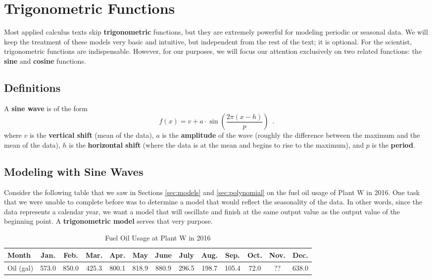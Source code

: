 \section{Trigonometric Functions}
\label{sec:trig}

Most applied calculus texts skip {\bf trigonometric} functions, but they are extremely powerful for modeling periodic or seasonal data. We will keep the treatment of these models very basic and intuitive, but independent from the rest of the text; it is optional. For the scientist, trigonometric functions are indispensable. However, for our purposes, we will focus our attention exclusively on two related functions: the {\bf sine} and {\bf cosine} functions.

\subsection{Definitions}


A {\bf sine wave} is of the form
\begin{equation}
\label{eq:sine}
f(x) = v + a \cdot \sin\left(\frac{2\pi(x-h)}{p}\right) \enspace .
\end{equation}
where $v$ is the {\bf vertical shift} (mean of the data), $a$ is the {\bf amplitude} of the wave (roughly the difference between the maximum and the mean of the data), $h$ is the {\bf horizontal shift} (where the data is at the mean and begins to rise to the maximum), and $p$ is the {\bf period}.

\subsection{Modeling with Sine Waves}

Consider the following table that we saw in Sections \ref{sec:models} and \ref{sec:polynomial} on the fuel oil usage of Plant W in 2016. One task that we were unable to complete before was to determine a model that would reflect the seasonality of the data. In other words, since the data represents a calendar year, we want a model that will oscillate and finish at the same output value as the output value of the beginning point. A {\bf trigonometric model} serves that very purpose.

\begin{table}[!ht]
\centering
\begin{tabular}{l*{12}{c}}
\toprule
Month & Jan. & Feb. & Mar. & Apr. & May & June & July & Aug. & Sep. & Oct. & Nov. & Dec. \\
\midrule
Oil (gal) & 573.0 & 850.0 &  425.3 & 800.1  & 818.9 &  880.9 &  296.5 & 198.7 & 105.4 & 72.0 & ?? & 638.0\\
\bottomrule
\end{tabular}
\caption{Fuel Oil Usage at Plant W in 2016}
\label{tab:1-9-oil}
\end{table}

